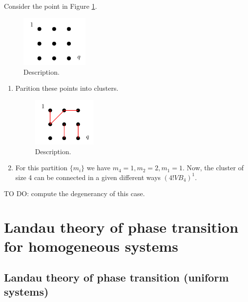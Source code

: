\documentclass[../main/main.tex]{subfiles}
\begin{document}
\begin{example}[\( N=q \)] Consider the point in Figure \ref{fig:15_8}.
\begin{figure}[h!]
\centering
\includegraphics[width=0.3\textwidth]{../lessons/15_image/11.pdf}
\caption{\label{fig:15_8} Description.}
\end{figure}
  \begin{enumerate}
  \item Parition these points into clusters.
  \begin{figure}[h!]
  \centering
  \includegraphics[width=0.3\textwidth]{../lessons/15_image/12.pdf}
  \caption{\label{fig:15_9} Description.}
  \end{figure}

  \item For this partition \( \{ m_i \}   \) we have \( m_4=1,m_2=2,m_1=1 \). Now, the cluster of size 4 can be connected in a given different ways \( (4! V B_4)^1 \).
  \end{enumerate}

  \begin{exercise}
  TO DO: compute the degenerancy of this case.
  \end{exercise}
\end{example}










\chapter{Landau theory of phase transition for homogeneous systems}

\section{Landau theory of phase transition (uniform systems)}
\end{document}
